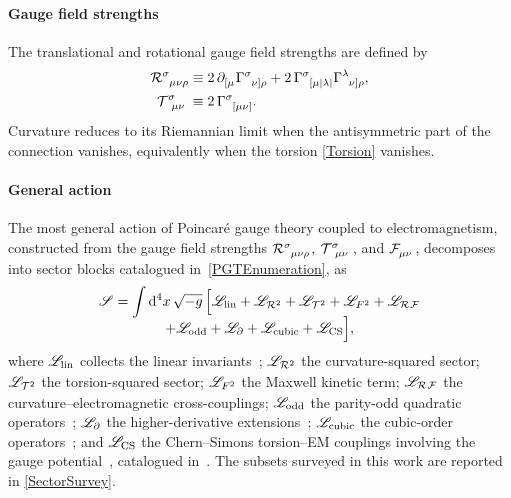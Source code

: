 \paragraph*{Gauge field strengths}
The translational and rotational gauge field strengths are defined
by%
\begin{align}
  \MAGF{^\sigma_\mu_\nu_\rho}
    &\equiv 2\,\PD{_{[\mu}}\MAGA{^\sigma_{\nu]}_\rho}
       + 2\,\MAGA{^\sigma_{[\mu|\lambda|}}\MAGA{^\lambda_{\nu]}_\rho},
  \label{Curvature} \\
  \MAGT{^\sigma_\mu_\nu}
    &\equiv 2\,\MAGA{^\sigma_{[\mu\nu]}}.
  \label{Torsion}
\end{align}
Curvature reduces to its Riemannian limit when the antisymmetric
part of the connection vanishes, equivalently when the torsion
\cref{Torsion} vanishes.

\paragraph*{General action}
The most general action of Poincar\'{e} gauge theory coupled to
electromagnetism, constructed from the gauge field
strengths $\MAGF{^\sigma_{\mu\nu\rho}}$, $\MAGT{^\sigma_{\mu\nu}}$,
and $\FieldF{_{\mu\nu}}$, decomposes into sector blocks catalogued
in~\cref{PGTEnumeration},
as~\cite{lin2019pgt,blagojevic2018hamiltonian,barker2024poincare,sezgin1980ghostfree,aoki2020nonlinear,bahamonde2025cubic}
\begin{multline}
  \act = \int \diff^4 x\,\sqrt{-g}\,\Bigl[
        \lag_\text{lin}
        + \lag_{\MAGF{^2}}
        + \lag_{\MAGT{^2}}
        + \lag_{F^2}
        + \lag_{\MAGF{}\FieldF{}} \\[-0.5em]
        + \lag_\text{odd}
        + \lag_\partial
        + \lag_\text{cubic}
        + \lag_\text{CS}
      \Bigr],
  \label{QuadraticAction}
\end{multline}
where $\mathscr{L}_\text{lin}$ collects the linear
invariants~\cite{kibble1961lorentz,holst1995barbero,barbero1995real,immirzi1997real};
$\lag_{\MAGF{^2}}$ the curvature-squared sector;
$\lag_{\MAGT{^2}}$ the torsion-squared sector;
$\mathscr{L}_{F^2}$ the Maxwell kinetic term; $\lag_{\MAGF{}\FieldF{}}$ the
curvature--electromagnetic cross-couplings; $\mathscr{L}_\text{odd}$
the parity-odd quadratic operators~\cite{karananas2014parity,blagojevic2018hamiltonian};
$\mathscr{L}_\partial$ the higher-derivative
extensions~\cite{aoki2020nonlinear}; $\mathscr{L}_\text{cubic}$ the
cubic-order operators~\cite{bahamonde2025cubic}; and
$\mathscr{L}_\text{CS}$ the Chern--Simons torsion--EM couplings
involving the gauge potential~\cite{hehl2000electromagnetic,itin2004maxwell,rubilar2003torsion},
catalogued in~\cite{obukhov2024electrodynamics}.
The subsets surveyed in this work are reported in
\cref{SectorSurvey}.

